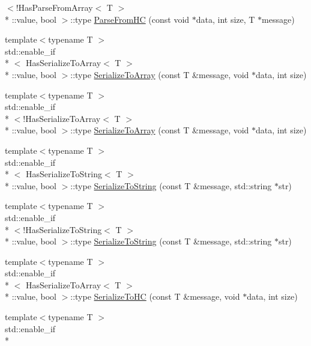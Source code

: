 \begin{DoxyCompactItemize}
$<$!Has\-Parse\-From\-Array$<$ T $>$\\*
\-::value, bool $>$\-::type \hyperlink{namespaceapollo_1_1cyber_1_1message_a100b9c6809db1365bf09a3c621751449}{Parse\-From\-H\-C} (const void $\ast$data, int size, T $\ast$message)
\item 
{\footnotesize template$<$typename T $>$ }\\std\-::enable\-\_\-if\\*
$<$ Has\-Serialize\-To\-Array$<$ T $>$\\*
\-::value, bool $>$\-::type \hyperlink{namespaceapollo_1_1cyber_1_1message_a101dafae7968f3114fa0d27935ee0630}{Serialize\-To\-Array} (const T \&message, void $\ast$data, int size)
\item 
{\footnotesize template$<$typename T $>$ }\\std\-::enable\-\_\-if\\*
$<$!Has\-Serialize\-To\-Array$<$ T $>$\\*
\-::value, bool $>$\-::type \hyperlink{namespaceapollo_1_1cyber_1_1message_a6fdb56336a64af71da0e2c79de30b949}{Serialize\-To\-Array} (const T \&message, void $\ast$data, int size)
\item 
{\footnotesize template$<$typename T $>$ }\\std\-::enable\-\_\-if\\*
$<$ Has\-Serialize\-To\-String$<$ T $>$\\*
\-::value, bool $>$\-::type \hyperlink{namespaceapollo_1_1cyber_1_1message_a56be747d5d58394d96f3b997a19c47b9}{Serialize\-To\-String} (const T \&message, std\-::string $\ast$str)
\item 
{\footnotesize template$<$typename T $>$ }\\std\-::enable\-\_\-if\\*
$<$!Has\-Serialize\-To\-String$<$ T $>$\\*
\-::value, bool $>$\-::type \hyperlink{namespaceapollo_1_1cyber_1_1message_a5608a318a0ae528e1629c9cfc87e489a}{Serialize\-To\-String} (const T \&message, std\-::string $\ast$str)
\item 
{\footnotesize template$<$typename T $>$ }\\std\-::enable\-\_\-if\\*
$<$ Has\-Serialize\-To\-Array$<$ T $>$\\*
\-::value, bool $>$\-::type \hyperlink{namespaceapollo_1_1cyber_1_1message_a388b614c8e6891dbfab3191e329ec7f1}{Serialize\-To\-H\-C} (const T \&message, void $\ast$data, int size)
\item 
{\footnotesize template$<$typename T $>$ }\\std\-::enable\-\_\-if\\*

\end{DoxyCompactItemize}
